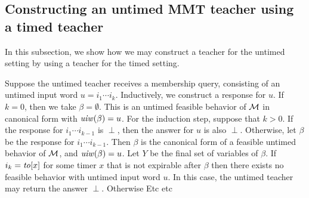 %

\subsection{Constructing an untimed MMT teacher using a timed teacher}
In this subsection, we show how we may construct a teacher for the untimed setting by using a teacher for the timed setting.

Suppose the untimed teacher receives a membership query, consisting of an untimed input word
$u = i_1 \cdots i_k$.
Inductively, we construct a response for $u$.
If $k=0$, then we take $\beta = \emptyset$.
This is an untimed feasible behavior of ${\cal M}$ in canonical form with $\mathit{uiw}(\beta)=u$.
For the induction step, suppose that $k>0$.
If the response for $i_1 \cdots i_{k-1}$ is $\perp$, then the answer for $u$ is also $\perp$.
Otherwise, let $\beta$ be the response for $i_1 \cdots i_{k-1}$.
Then $\beta$ is the canonical form of a feasible untimed behavior of ${\cal M}$, and $\mathit{uiw}(\beta)=u$.
Let $Y$ be the final set of variables of $\beta$.
If $i_k = \mathit{to}[x]$ for some timer $x$ that is not expirable after $\beta$ then there exists no feasible behavior
with untimed input word $u$. In this case, the untimed teacher may return the answer $\perp$.
Otherwise  Etc etc

